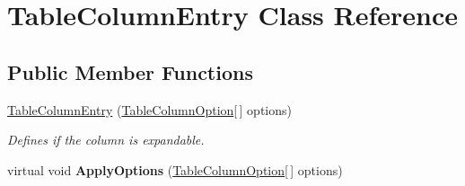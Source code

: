 \hypertarget{class_table_column_entry}{}\section{Table\+Column\+Entry Class Reference}
\label{class_table_column_entry}
\subsection*{Public Member Functions}
\begin{DoxyCompactItemize}
\item 
\mbox{\hyperlink{class_table_column_entry_af655798cdcaa427f57b1065e54afbc71}{Table\+Column\+Entry}} (\mbox{\hyperlink{class_table_column_option}{Table\+Column\+Option}}\mbox{[}$\,$\mbox{]} options)
\begin{DoxyCompactList}\small\item\em Defines if the column is expandable. \end{DoxyCompactList}\item 
\mbox{\label{class_table_column_entry_add3ff00a26e27b2d94df48b9c6fade1a}} 
virtual void {\bfseries Apply\+Options} (\mbox{\hyperlink{class_table_column_option}{Table\+Column\+Option}}\mbox{[}$\,$\mbox{]} options)
\end{DoxyCompactItemize}
